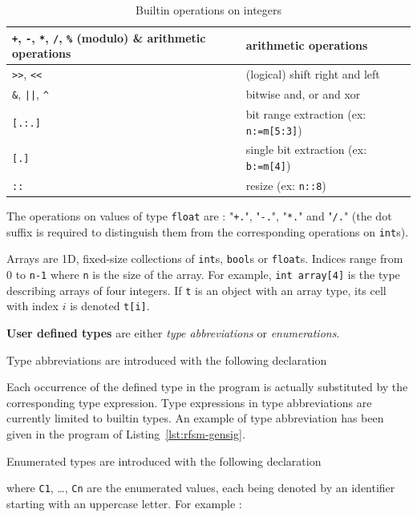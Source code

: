 \begin{table}
\begin{center}
\begin{tabular}{|l|l|} \hline
\verb|+|, \verb|-|, \verb|*|, \verb|/|, \verb|%| (modulo) & arithmetic operations \\ \hline 
\verb|>>|, \verb|<<| & (logical) shift right and left \\ \hline 
\verb|&|, \verb+||+, \verb|^| & bitwise and, or and xor \\ \hline 
\verb|[.:.]| & bit range extraction (ex: \verb|n:=m[5:3]|) \\ \hline 
\verb|[.]| & single bit extraction (ex: \verb|b:=m[4]|) \\ \hline 
\verb|::| & resize (ex: \verb|n::8|) \\ \hline 
\end{tabular}
\label{tab:int-ops}
\caption{Builtin operations on integers}
\end{center}
\end{table}


\step The operations on values of type \texttt{float} are : "\verb|+.|", "\verb|-.|", "\verb|*.|" and
"\verb|/.|" (the dot suffix is required to distinguish them from the corresponding operations on
\texttt{int}s).

\step Arrays are 1D, fixed-size collections of \verb|int|s, \verb|bool|s or \verb|float|s. Indices
range from 0 to \verb|n-1| where \verb|n| is the size of the array. For example,
 \verb|int array[4]| is the type describing arrays of four integers. If \verb|t| is an object
  with an array type, its cell with index $i$ is denoted \verb|t[i]|.


\medskip
\textbf{User defined types} are either \emph{type abbreviations} or \emph{enumerations}.

\step Type abbreviations are introduced with the following declaration
\begin{center}
\end{center}
Each occurrence of the defined type in the program is actually substituted by the corresponding type
expression. Type expressions in type abbreviations are currently limited to builtin types.
An example of type abbreviation has been given in the program of Listing~\ref{lst:rfsm-gensig}. 

\medskip
\step Enumerated types  are introduced with the following declaration
\begin{center}
\end{center}
where \verb|C1|, \ldots, \verb|Cn| are the enumerated values, each being denoted by an identifier
starting with an uppercase letter. For example : 
\begin{center}
\end{center}


